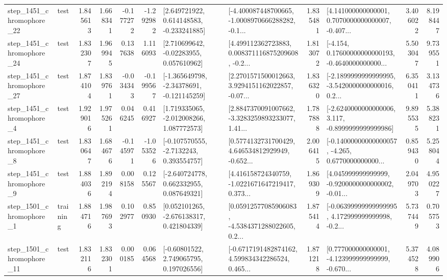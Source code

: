 \begin{tabular}{llrrrrllrlrr}
 step\_1451\_chromophore\_22 &      test &      1.845613 &    1.668341 &     -0.177272 & -1.292982 &    [2.649721922, 0.614148583, -0.233241885] &  [-4.400087448700665, -1.0008970666288282, -0.1... &       1.835481 &  [4.141000000000001, 0.7070000000000007, -0.407... &            3.406022 &          8.198447 \\
 step\_1451\_chromophore\_24 &      test &      1.832307 &    1.969945 &      0.137638 &  1.116093 &     [2.710699642, -0.02283955, 0.057610962] &  [4.499112362723883, 0.008371116875209608, -0.2... &       1.813072 &  [-4.154, 0.17600000000000193, -0.4640000000000... &            5.503047 &          9.739551 \\
 step\_1451\_chromophore\_27 &      test &      1.874104 &    1.839761 &     -0.034343 & -0.199567 &   [-1.365649798, -2.34378691, -0.121145259] &  [2.2701571500012663, 3.9294151162022857, -0.07... &       1.836320 &  [-2.1899999999999995, -3.5420000000000016, 0.2... &            6.350411 &          3.134736 \\
  step\_1451\_chromophore\_4 &      test &      1.929016 &    1.975261 &      0.046245 &  0.416927 &    [1.719335065, -2.012008266, 1.087772573] &  [2.8847370091007662, -3.3283259893233077, 1.41... &       1.787888 &  [-2.6240000000000006, 3.117, -0.8999999999999986] &            9.895535 &          5.388231 \\
  step\_1451\_chromophore\_8 &      test &      1.830647 &    1.684676 &     -0.145971 & -1.053526 &     [-0.107570555, -2.7132243, 0.393554757] &  [0.5774132731700429, 4.646534812929949, -0.652... &       2.006415 &  [-0.14000000000000057, -4.265, 0.6770000000000... &            0.859430 &          5.258044 \\
  step\_1451\_chromophore\_9 &      test &      1.884036 &    1.892194 &      0.008158 &  0.125567 &    [-2.640724778, 0.662332955, 0.087649321] &  [4.416158724340759, -1.0221671647219417, 0.373... &       1.869309 &  [4.045999999999999, -0.9200000000000002, -0.01... &            2.049703 &          4.950227 \\
  step\_1501\_chromophore\_1 &  training &      1.884716 &    1.987693 &      0.102977 &  0.850930 &    [0.052101265, -2.676138317, 0.421804339] &  [0.05912577085906083, -4.5384371288022605, 0.2... &       1.875414 &  [-0.06399999999999995, 4.172999999999998, -0.2... &            5.737449 &          0.705753 \\
 step\_1501\_chromophore\_11 &      test &      1.832116 &    1.832301 &      0.000185 &  0.064568 &     [-0.60801522, 2.749065795, 0.197026556] &  [-0.6717191482874162, 4.599834342286524, 0.465... &       1.871218 &  [0.777000000000001, -4.123999999999999, -0.670... &            5.374528 &          4.089906 \\

\end{tabular}
